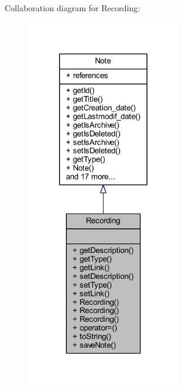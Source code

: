 Collaboration diagram for Recording\+:\nopagebreak
\begin{figure}[H]
\begin{center}
\leavevmode
\includegraphics[width=191pt]{class_recording__coll__graph}
\end{center}
\end{figure}
